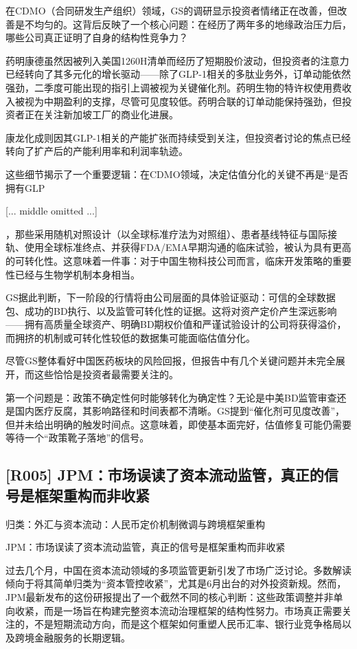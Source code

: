 \documentclass[11pt]{ctexart}
\begin{document}
在CDMO（合同研发生产组织）领域，GS的调研显示投资者情绪正在改善，但改善是不均匀的。这背后反映了一个核心问题：在经历了两年多的地缘政治压力后，哪些公司真正证明了自身的结构性竞争力？

药明康德虽然因被列入美国1260H清单而经历了短期股价波动，但投资者的注意力已经转向了其多元化的增长驱动——除了GLP-1相关的多肽业务外，订单动能依然强劲，二季度可能出现的指引上调被视为关键催化剂。药明生物的特许权使用费收入被视为中期盈利的支撑，尽管可见度较低。药明合联的订单动能保持强劲，但投资者正在关注新加坡工厂的商业化进展。

康龙化成则因其GLP-1相关的产能扩张而持续受到关注，但投资者讨论的焦点已经转向了扩产后的产能利用率和利润率轨迹。

这些细节揭示了一个重要逻辑：在CDMO领域，决定估值分化的关键不再是“是否拥有GLP

[... middle omitted ...]

，那些采用随机对照设计（以全球标准疗法为对照组）、患者基线特征与国际接轨、使用全球标准终点、并获得FDA/EMA早期沟通的临床试验，被认为具有更高的可转化性。这意味着一件事：对于中国生物科技公司而言，临床开发策略的重要性已经与生物学机制本身相当。

GS据此判断，下一阶段的行情将由公司层面的具体验证驱动：可信的全球数据包、成功的BD执行、以及监管可转化性的证据。这将对资产定价产生深远影响——拥有高质量全球资产、明确BD期权价值和严谨试验设计的公司将获得溢价，而拥挤的机制或可转化性较低的数据集可能面临估值分化。

尽管GS整体看好中国医药板块的风险回报，但报告中有几个关键问题并未完全展开，而这些恰恰是投资者最需要关注的。

第一个问题是：政策不确定性何时能够转化为确定性？无论是中美BD监管审查还是国内医疗反腐，其影响路径和时间表都不清晰。GS提到“催化剂可见度改善”，但并未给出明确的触发时间点。这意味着，即使基本面完好，估值修复可能仍需要等待一个“政策靴子落地”的信号。

\subsection{[R005] JPM：市场误读了资本流动监管，真正的信号是框架重构而非收紧}
{\small\color{refgray}归类：外汇与资本流动：人民币定价机制微调与跨境框架重构}

JPM：市场误读了资本流动监管，真正的信号是框架重构而非收紧

过去几个月，中国在资本流动领域的多项监管更新引发了市场广泛讨论。多数解读倾向于将其简单归类为“资本管控收紧”，尤其是6月出台的对外投资新规。然而，JPM最新发布的这份研报提出了一个截然不同的核心判断：这些政策调整并非单向收紧，而是一场旨在构建完整资本流动治理框架的结构性努力。市场真正需要关注的，不是短期流动方向，而是这个框架如何重塑人民币汇率、银行业竞争格局以及跨境金融服务的长期逻辑。
\end{document}
